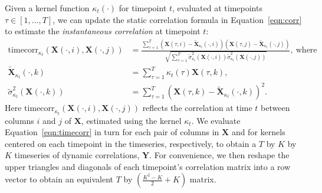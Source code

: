 \documentclass[english]{article}
\providecommand{\DIFaddtex}[1]{{\protect\color{blue}\uwave{#1}}} %
\providecommand{\DIFaddbegin}{} %
\providecommand{\DIFaddend}{} %
\providecommand{\DIFadd}[1]{\texorpdfstring{\DIFaddtex{#1}}{#1}} %
\newcommand{\DIFaddincludegraphics}[2][]{{\color{blue}\fbox{\DIFOincludegraphics[#1]{#2}}}} %
\DeclareRobustCommand{\DIFaddbegin}{\DIFOaddbegin \let\includegraphics\DIFaddincludegraphics} %
\DeclareRobustCommand{\DIFaddend}{\DIFOaddend \let\includegraphics\DIFOincludegraphics} %
\begin{document}
Given a kernel function $\kappa_t(\cdot)$ for timepoint $t$,
evaluated at timepoints $\tau \in \left[ 1, ..., T \right]$, we
can update the static correlation formula in Equation~\ref{eqn:corr}
to estimate the \textit{instantaneous correlation} at timepoint $t$:
\begin{align}
  \mathrm{timecorr}_{\kappa_t}\left(\mathbf{X}(\cdot, i), \mathbf{X}(\cdot, j)\right) &= \frac{\sum_{\tau=1}^T \left( \mathbf{X}(\tau, i) -
                                       \widetilde{\mathbf{X}}_{\kappa_t}(\cdot,
                                                                                        i) \right)
                                 \left( \mathbf{X}(\tau, j) -
                                        \widetilde{\mathbf{X}}_{\kappa_t}(\cdot,
                                                                                        j)\right)}{\sqrt{\sum_{\tau=1}^T
                                              \widetilde{\sigma}_{\kappa_t}^2(\mathbf{X}(\cdot,
                                                                                        i))
                                              \widetilde{\sigma}_{\kappa_t}^2(\mathbf{X}(\cdot, j))}},~\mathrm{where}\label{eqn:timecorr}\\
  \widetilde{\mathbf{X}}_{\kappa_t}(\cdot, k) &= \sum_{\tau=1}^T
                       \kappa_t(\tau)\mathbf{X}(\tau, k),\\
  \widetilde{\sigma}_{\kappa_t}^2(\mathbf{X}(\cdot, k)) &= \sum_{\tau=1}^T
                                                  \left(
                                                  \mathbf{X}(\tau, k) -
                            \widetilde{\mathbf{X}}_{\kappa_t}(\cdot, k) \right)^2.
\end{align}
Here
$\mathrm{timecorr}_{\kappa_t}(\mathbf{X}(\cdot, i), \mathbf{X}(\cdot,
j))$ reflects the correlation at time $t$ between columns $i$ and $j$
of $\mathbf{X}$, estimated using the kernel $\kappa_t$.  We evaluate
Equation~\ref{eqn:timecorr} in turn for each pair of columns in
$\mathbf{X}$ and for kernels centered on each timepoint in the
timeseries, respectively, to obtain a $T$ by $K$ by $K$ timeseries of
dynamic correlations, $\mathbf{Y}$.  For convenience, we then reshape
the upper triangles and diagonals of each timepoint's \DIFaddbegin \DIFadd{symmetric }\DIFaddend correlation matrix into a row
vector to obtain an equivalent $T$ by $\left( \frac{K^2 - K}{2} + K \right)$ matrix.
\end{document}
